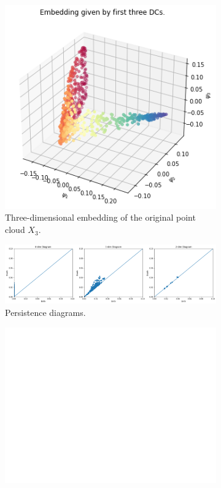 \begin{figure}[H]
\centering
\begin{subfigure}[b]{0.2\textwidth}
    \includegraphics[width=\textwidth]{figures/X3_embedding.png}
    \caption{Three-dimensional embedding of the original point cloud $X_3$.}
\end{subfigure}
\hfill
\begin{subfigure}[b]{0.75\textwidth}
    \includegraphics[width=\textwidth]{figures/X3_H0.png}
    \caption{Persistence diagrams.}
\end{subfigure}
\begin{subfigure}[b]{0.25\textwidth}
\includegraphics[width=\textwidth]{figures/white.png} 

\end{subfigure}
\end{figure}

